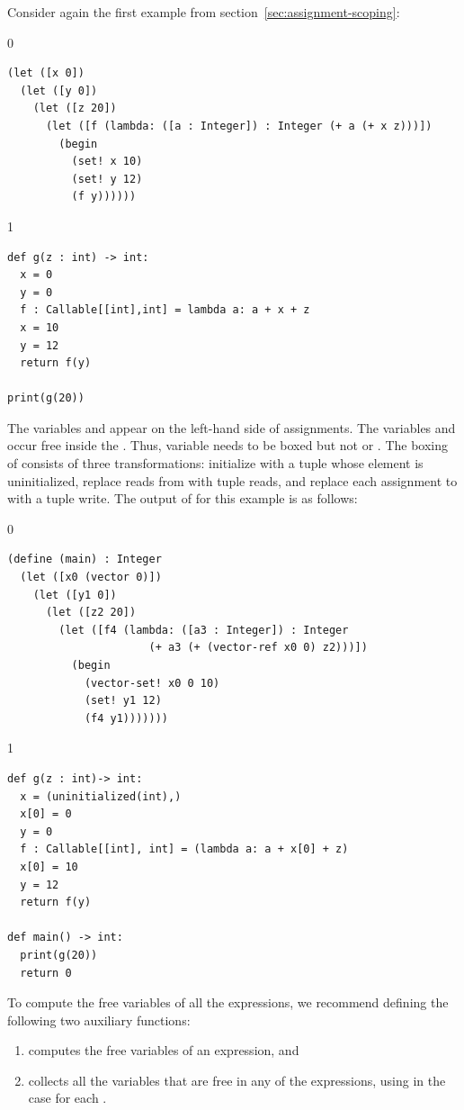 \documentclass[7x10]{TimesAPriori_MIT}%
\def\racketEd{0}
\def\pythonEd{1}
\providecommand{\BookEdition}{1}
\let\edition\BookEdition
\newcommand{\pythonColor}[0]{}
\numberwithin{theorem}{chapter}
\numberwithin{definition}{chapter}
\numberwithin{equation}{chapter}
\begin{document}
Consider again the first example from
section~\ref{sec:assignment-scoping}:
%
{\if\edition\racketEd
\begin{lstlisting}
(let ([x 0])
  (let ([y 0])
    (let ([z 20])
      (let ([f (lambda: ([a : Integer]) : Integer (+ a (+ x z)))])
        (begin
          (set! x 10)
          (set! y 12)
          (f y))))))
\end{lstlisting}
\fi}
{\if\edition\pythonEd\pythonColor
\begin{lstlisting}
def g(z : int) -> int:
  x = 0
  y = 0  
  f : Callable[[int],int] = lambda a: a + x + z
  x = 10
  y = 12
  return f(y)

print(g(20))
\end{lstlisting}
\fi}
%
\noindent The variables  and  appear on the left-hand
side of assignments.  The variables  and  occur free
inside the . Thus, variable  needs to be boxed
but not  or .  The boxing of  consists of
three transformations: initialize  with a tuple whose element
is uninitialized, replace reads from  with tuple reads, and
replace each assignment to  with a tuple write. The output of
 for this example is as follows:
%
{\if\edition\racketEd
\begin{lstlisting}
(define (main) : Integer
  (let ([x0 (vector 0)])
    (let ([y1 0])
      (let ([z2 20])
        (let ([f4 (lambda: ([a3 : Integer]) : Integer
                      (+ a3 (+ (vector-ref x0 0) z2)))])
          (begin 
            (vector-set! x0 0 10)
            (set! y1 12)
            (f4 y1)))))))
\end{lstlisting}
\fi}
%
{\if\edition\pythonEd\pythonColor
\begin{lstlisting}
def g(z : int)-> int:
  x = (uninitialized(int),)
  x[0] = 0
  y = 0
  f : Callable[[int], int] = (lambda a: a + x[0] + z)
  x[0] = 10
  y = 12
  return f(y)

def main() -> int:
  print(g(20))
  return 0
\end{lstlisting}
\fi}

To compute the free variables of all the  expressions, we
recommend defining the following two auxiliary functions:
\begin{enumerate}
\item {} computes the free variables of an expression, and
\item {} collects all the variables that are
  free in any of the  expressions, using
   in the case for each .
\end{enumerate}
\end{document}
